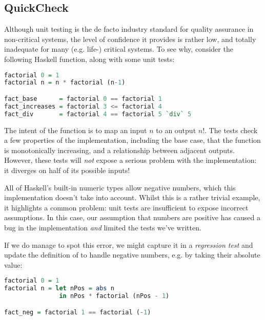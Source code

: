\subsection{QuickCheck}
\label{sec:quickcheck}

Although unit testing is the de facto industry standard for quality assurance in non-critical systems, the level of confidence it provides is rather low, and totally inadequate for many (e.g. life-) critical systems. To see why, consider the following Haskell function, along with some unit tests:

\begin{lstlisting}[language=Haskell, xleftmargin=.2\textwidth, xrightmargin=.2\textwidth]
factorial 0 = 1
factorial n = n * factorial (n-1)

fact_base      = factorial 0 == factorial 1
fact_increases = factorial 3 <= factorial 4
fact_div       = factorial 4 == factorial 5 `div` 5
\end{lstlisting}

The intent of the function is to map an input $n$ to an output $n!$. The tests check a few properties of the implementation, including the base case, that the function is monotonically increasing, and a relationship between adjacent outputs. However, these tests will \emph{not} expose a serious problem with the implementation: it diverges on half of its possible inputs!

All of Haskell's built-in numeric types allow negative numbers, which this implementation doesn't take into account. Whilst this is a rather trivial example, it highlights a common problem: unit tests are insufficient to expose incorrect assumptions. In this case, our assumption that numbers are positive has caused a bug in the implementation \emph{and} limited the tests we've written.

If we do manage to spot this error, we might capture it in a \emph{regression test} and update the definition of  to handle negative numbers, e.g. by taking their absolute value:

\iffalse TODO: Re-use these examples later on, e.g. for QuickSpec exploration \fi

\begin{lstlisting}[language=Haskell, xleftmargin=.2\textwidth, xrightmargin=.2\textwidth]
factorial 0 = 1
factorial n = let nPos = abs n
               in nPos * factorial (nPos - 1)

fact_neg = factorial 1 == factorial (-1)
\end{lstlisting}


